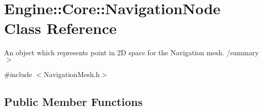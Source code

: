 \hypertarget{struct_engine_1_1_core_1_1_navigation_node}{}\section{Engine\+:\+:Core\+:\+:Navigation\+Node Class Reference}
\label{struct_engine_1_1_core_1_1_navigation_node}


An object which represents point in 2D space for the Navigation mesh. /summary$>$  




{\ttfamily \#include $<$Navigation\+Mesh.\+h$>$}

\subsection*{Public Member Functions}
